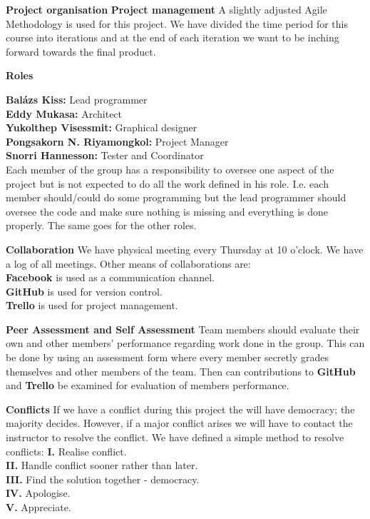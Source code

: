 \documentclass[11pt]{article}
\begin{document}

\textbf{Project organisation}
\textbf{Project management}
A slightly adjusted Agile Methodology is used for this project. We have divided the time period for this course into iterations and at the end of each iteration we want to be inching forward towards the final product.

\textbf{Roles}


\textbf{Balázs Kiss:} Lead programmer \\
\textbf{Eddy Mukasa:} Architect \\
\textbf{Yukolthep Visessmit:} Graphical designer \\
\textbf{Pongsakorn N. Riyamongkol:} Project Manager \\
\textbf{Snorri Hannesson:} Tester and Coordinator \\ \newline
Each member of the group has a responsibility to oversee one aspect of the project but is not expected to do all the work defined in his role. I.e. each member should/could do some programming but the lead programmer should oversee the code and make sure nothing is missing and everything is done properly. The same goes for the other roles.

\textbf{Collaboration}
We have physical meeting every Thursday at 10 o'clock. We have a log of all meetings. Other means of collaborations are:
\newline \\
\textbf{Facebook} is used as a communication channel. \\
\textbf{GitHub} is used for version control. \\
\textbf{Trello} is used for project management.


\textbf{Peer Assessment and Self Assessment}
Team members should evaluate their own and other members' performance regarding work done in the group. This can be
done by using an assessment form where every member secretly grades themselves and other members of the team. Then can contributions to
\textbf{GitHub} and \textbf{Trello} be examined for evaluation of members performance.

\textbf{Conflicts}
If we have a conflict during this project the will have democracy; the majority decides. However, if a major conflict arises we will have to contact the instructor to resolve the conflict. We have defined a simple method to resolve conflicts: 
\newline
\textbf{I.} Realise conflict. \\
\textbf{II.} Handle conflict sooner rather than later. \\
\textbf{III.} Find the solution together - democracy. \\
\textbf{IV.} Apologise. \\
\textbf{V.} Appreciate. \\
\end{document}
